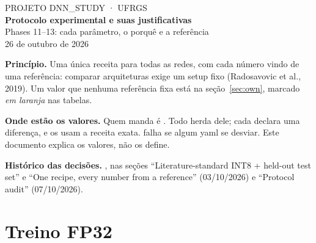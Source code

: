 \documentclass[10pt,a4paper]{article}
\newcommand{\own}[1]{{\color{own}\itshape #1}}
\begin{document}
\begin{center}
  {\sffamily\small\color{muted}PROJETO DNN\_STUDY · UFRGS}\\[0.6em]
  {\sffamily\huge\bfseries\color{accent}Protocolo experimental e suas justificativas}\\[0.4em]
  {\sffamily\large Phases 11--13: cada parâmetro, o porquê e a referência}\\[0.3em]
  {\small\color{muted}26 de outubro de 2026}
\end{center}
\vspace{0.4em}

\begin{tcolorbox}[colback=zebra,colframe=accent,boxrule=0.6pt,arc=2pt,left=8pt,right=8pt,top=6pt,bottom=6pt,
                  fonttitle=\sffamily\bfseries,title=Como ler este documento]
\small
\textbf{Princípio.} Uma única receita para todas as redes, com cada número vindo de uma referência: comparar arquiteturas
exige um setup fixo (Radosavovic et al., 2019). Um valor que nenhuma referência fixa está na seção~\ref{sec:own},
marcado \own{em laranja} nas tabelas.

\textbf{Onde estão os valores.} Quem manda é . Todo
 herda dele; cada  declara uma diferença, e os  usam a receita
exata.  falha se algum yaml se desviar. Este documento explica os valores, não os define.

\textbf{Histórico das decisões.} , nas seções ``Literature-standard INT8 + held-out test
set'' e ``One recipe, every number from a reference'' (03/10/2026) e ``Protocol audit'' (07/10/2026).
\end{tcolorbox}

\section{Treino FP32}
\end{document}
